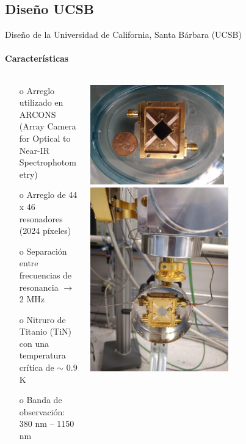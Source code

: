 \documentclass[ignorenonframetext,12pt]{beamer}
\begin{document}
\subsection{Diseño UCSB}
\begin{frame}{Diseño de la Universidad de California, Santa Bárbara (UCSB)}
	\framesubtitle{Características}
	\begin{columns}
		\begin{column}{0.49\textwidth}
			\begin{itemize}
				\item[o] Arreglo utilizado en
					{\color{blue}ARCONS} (Array
					Camera for Optical to Near-IR
					Spectrophotometry)
				\item[o] Arreglo de 44 x 46 resonadores (\alert{2024
					píxeles})
				\item[o] Separación entre frecuencias de
					resonancia $\to$ \alert{2 MHz}
				\item[o] Nitruro de Titanio (TiN) con una temperatura
					crítica de \alert{$\sim$ 0.9 K}
				\item[o] Banda de observación: \alert{380 nm --
					1150 nm}
			\end{itemize}
		\end{column}
		\begin{column}{0.49\textwidth}
			\centering
			\includegraphics[width=0.6\textwidth]{mkid4}
			\includegraphics[angle=-90,width=0.62\textwidth]{mkid2}

\end{column}
\end{columns}
\end{frame}
\end{document}
